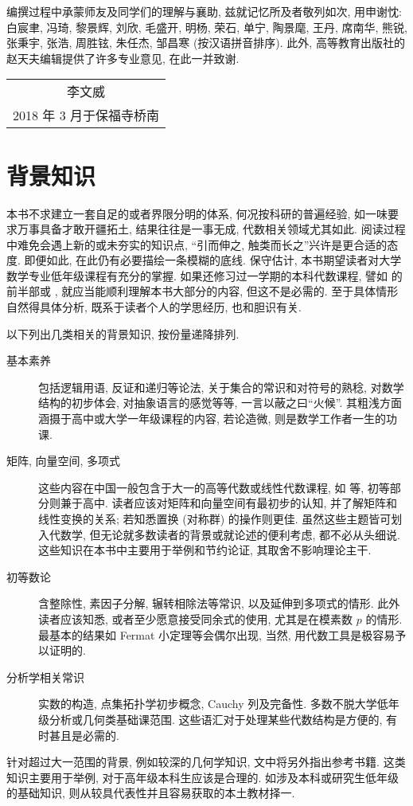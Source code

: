 编撰过程中承蒙师友及同学们的理解与襄助, 兹就记忆所及者敬列如次, 用申谢忱: 白宸聿, 冯琦, 黎景辉, 刘欣, 毛盛开, 明杨, 荣石, 单宁, 陶景麾, 王丹, 席南华, 熊锐, 张秉宇, 张浩, 周胜铉, 朱任杰, 邹昌寒 {\small(按汉语拼音排序)}. 此外, 高等教育出版社的赵天夫编辑提供了许多专业意见, 在此一并致谢.\nopagebreak

\vspace{1em}
\begin{flushright}\begin{minipage}{0.3 \textwidth}
	\begin{tabular}{c}
		{\kaishu 李文威} \\
		2018 年 3 月于保福寺桥南
	\end{tabular}
\end{minipage}\end{flushright}
\vspace{1em}

\section*{背景知识}
本书不求建立一套自足的或者界限分明的体系, 何况按科研的普遍经验, 如一味要求万事具备才敢开疆拓土, 结果往往是一事无成, 代数相关领域尤其如此. 阅读过程中难免会遇上新的或未夯实的知识点, ``引而伸之, 触类而长之''兴许是更合适的态度. 即便如此, 在此仍有必要描绘一条模糊的底线. 保守估计, 本书期望读者对大学数学专业低年级课程有充分的掌握. 如果还修习过一学期的本科代数课程, 譬如 \cite{DN00} 的前半部或 \cite{ZHR}, 就应当能顺利理解本书大部分的内容, 但这不是必需的. 至于具体情形自然得具体分析, 既系于读者个人的学思经历, 也和胆识有关.

以下列出几类相关的背景知识, 按份量递降排列.
\begin{description}
	\item[基本素养] 包括逻辑用语, 反证和递归等论法, 关于集合的常识和对符号的熟稔, 对数学结构的初步体会, 对抽象语言的感觉等等, 一言以蔽之曰``火候''. 其粗浅方面涵摄于高中或大学一年级课程的内容, 若论造微, 则是数学工作者一生的功课.
	\item[矩阵, 向量空间, 多项式] 这些内容在中国一般包含于大一的高等代数或线性代数课程, 如 \cite{Xi16, Xi18} 等, 初等部分则兼于高中. 读者应该对矩阵和向量空间有最初步的认知, 并了解矩阵和线性变换的关系; 若知悉置换 (对称群) 的操作则更佳. 虽然这些主题皆可划入代数学, 但无论就多数读者的背景或就论述的便利考虑, 都不必从头细说. 这些知识在本书中主要用于举例和节约论证, 其取舍不影响理论主干.
	\item[初等数论] 含整除性, 素因子分解, 辗转相除法等常识, 以及延伸到多项式的情形. 此外读者应该知悉, 或者至少愿意接受同余式的使用, 尤其是在模素数 $p$ 的情形. 最基本的结果如 Fermat 小定理等会偶尔出现, 当然, 用代数工具是极容易予以证明的.
	\item[分析学相关常识] 实数的构造, 点集拓扑学初步概念, Cauchy 列及完备性. 多数不脱大学低年级分析或几何类基础课范围. 这些语汇对于处理某些代数结构是方便的, 有时甚且是必需的.
\end{description}
针对超过大一范围的背景, 例如较深的几何学知识, 文中将另外指出参考书籍. 这类知识主要用于举例, 对于高年级本科生应该是合理的. 如涉及本科或研究生低年级的基础知识, 则从较具代表性并且容易获取的本土教材择一.

